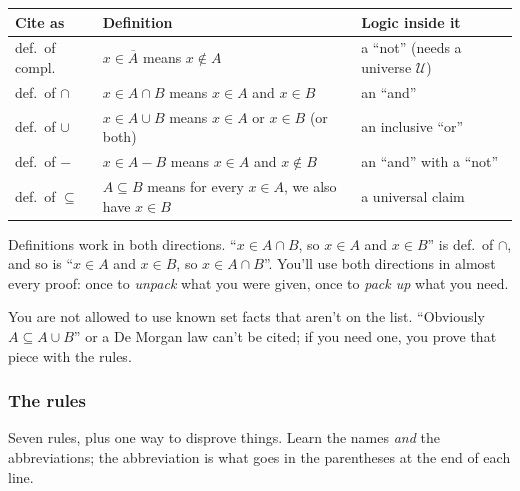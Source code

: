 \begin{center}
\begin{tabularx}{\linewidth}{@{}l>{\raggedright\arraybackslash}p{6.6cm}L@{}}
\toprule
\textbf{Cite as} & \textbf{Definition} & \textbf{Logic inside it}\\
\midrule
def.\ of compl. & $x\in\overline{A}$ means $x\notin A$ & a ``not'' (needs a universe $\mathcal{U}$)\\
def.\ of $\cap$ & $x\in A\cap B$ means $x\in A$ and $x\in B$ & an ``and''\\
def.\ of $\cup$ & $x\in A\cup B$ means $x\in A$ or $x\in B$ (or both) & an inclusive ``or''\\
def.\ of $-$ & $x\in A-B$ means $x\in A$ and $x\notin B$ & an ``and'' with a ``not''\\
def.\ of $\subseteq$ & $A\subseteq B$ means for every $x\in A$, we also have $x\in B$ & a universal claim\\
\bottomrule
\end{tabularx}
\end{center}

Definitions work in both directions. ``$x\in A\cap B$, so $x\in A$ and $x\in B$'' is def.\ of $\cap$, and so is ``$x\in A$ and $x\in B$, so $x\in A\cap B$''. You'll use both directions in almost every proof: once to \emph{unpack} what you were given, once to \emph{pack up} what you need.

You are not allowed to use known set facts that aren't on the list. ``Obviously $A\subseteq A\cup B$'' or a De Morgan law can't be cited; if you need one, you prove that piece with the rules.

\subsubsection{The rules}

Seven rules, plus one way to disprove things. Learn the names \emph{and} the abbreviations; the abbreviation is what goes in the parentheses at the end of each line.

